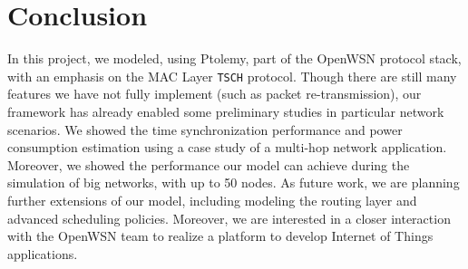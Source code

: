 
\section{Conclusion}
\label{sec:conclusion}

In this project, we modeled, using Ptolemy, part of the OpenWSN protocol stack, with an emphasis on the MAC Layer \texttt{TSCH} protocol. Though there are still many features we have not fully implement (such as packet re-transmission), our framework has already enabled some preliminary studies in particular network scenarios. We showed the time synchronization performance and power consumption estimation using a case study of a multi-hop network application. Moreover, we showed the performance our model can achieve during the simulation of big networks, with up to 50 nodes.
As future work, we are planning further extensions of our model, including modeling the routing layer and advanced scheduling policies. Moreover, we are interested in a closer interaction with the OpenWSN team to realize a platform to develop Internet of Things applications.

